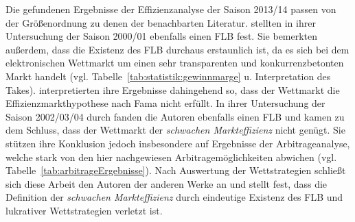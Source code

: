 Die gefundenen Ergebnisse der Effizienzanalyse der Saison 2013/14 passen von der Größenordnung zu denen der benachbarten Literatur. \citet{kossmeier2008efficiency} stellten in ihrer Untersuchung der Saison 2000/01 ebenfalls einen FLB fest. Sie bemerkten außerdem, dass die Existenz des FLB durchaus erstaunlich ist, da es sich bei dem elektronischen Wettmarkt um einen sehr transparenten und konkurrenzbetonten Markt handelt (vgl. Tabelle~\ref{tab:statistik:gewinnmarge} u. Interpretation des Takes). \citeauthor{kossmeier2008efficiency} interpretierten ihre Ergebnisse dahingehend so, dass der Wettmarkt die Effizienzmarkthypothese nach Fama nicht erfüllt. In ihrer Untersuchung der Saison 2002/03/04 durch \citet{vlastakis2009efficient} fanden die Autoren ebenfalls einen FLB und kamen zu dem Schluss, dass der Wettmarkt der \textit{schwachen Markteffizienz} nicht genügt. Sie stützen ihre Konklusion jedoch insbesondere auf Ergebnisse der Arbitrageanalyse, welche stark von den hier nachgewiesen Arbitragemöglichkeiten abwichen (vgl. Tabelle~\ref{tab:arbitrageErgebnisse}). Nach Auswertung der Wettstrategien schließt sich diese Arbeit den Autoren der anderen Werke an und stellt fest, dass die Definition der \textit{schwachen Markteffizienz} durch eindeutige Existenz des FLB und lukrativer Wettstrategien verletzt ist.















